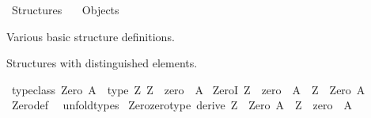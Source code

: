 %
\begin{isabellebody}%
%
%
\isadelimdocument
%
\endisadelimdocument
%
\isatagdocument
\isanewline
\isanewline
%
\isamarkuptrue%
%
\endisatagdocument
{\isafolddocument}%
%
\isadelimdocument
%
\endisadelimdocument
%
\isadelimtheory
%
\endisadelimtheory
%
\isatagtheory
{}\isamarkupfalse%
\ Structures\isanewline
\ \ \ Objects\isanewline
{}%
\endisatagtheory
{\isafoldtheory}%
%
\isadelimtheory
%
\endisadelimtheory
%
\begin{isamarkuptext}%
Various basic structure definitions.%
\end{isamarkuptext}\isamarkuptrue%
%
\isadelimdocument
%
\endisadelimdocument
%
\isatagdocument
%
\isamarkuptrue%
%
\endisatagdocument
{\isafolddocument}%
%
\isadelimdocument
%
\endisadelimdocument
%
\begin{isamarkuptext}%
Structures with distinguished elements.%
\end{isamarkuptext}\isamarkuptrue%
\isamarkupfalse%
\ {\isacharbrackleft}{\kern0pt}typeclass{\isacharbrackright}{\kern0pt}{\isacharcolon}{\kern0pt}\ {\isachardoublequoteopen}Zero\ A\ {\isasymequiv}\ type\ {\isacharparenleft}{\kern0pt}{\isasymlambda}Z{\isachardot}{\kern0pt}\ Z\ {\isacharat}{\kern0pt}{\isacharat}{\kern0pt}\ zero\ {\isacharcolon}{\kern0pt}\ A{\isacharparenright}{\kern0pt}{\isachardoublequoteclose}\isanewline
\isanewline
{}\isamarkupfalse%
\ ZeroI{\isacharcolon}{\kern0pt}\ {\isachardoublequoteopen}Z\ {\isacharat}{\kern0pt}{\isacharat}{\kern0pt}\ zero\ {\isacharcolon}{\kern0pt}\ A\ {\isasymLongrightarrow}\ Z\ {\isacharcolon}{\kern0pt}\ Zero\ A{\isachardoublequoteclose}\isanewline
%
\isadelimproof
\ \ %
\endisadelimproof
%
\isatagproof
{}\isamarkupfalse%
\ Zero{\isacharunderscore}{\kern0pt}def\ \isamarkupfalse%
\ unfold{\isacharunderscore}{\kern0pt}types%
\endisatagproof
{\isafoldproof}%
%
\isadelimproof
\isanewline
%
\endisadelimproof
\isanewline
{}\isamarkupfalse%
\ Zero{\isacharunderscore}{\kern0pt}zero{\isacharunderscore}{\kern0pt}type\ {\isacharbrackleft}{\kern0pt}derive{\isacharbrackright}{\kern0pt}{\isacharcolon}{\kern0pt}\ {\isachardoublequoteopen}Z\ {\isacharcolon}{\kern0pt}\ Zero\ A\ {\isasymLongrightarrow}\ Z\ {\isacharat}{\kern0pt}{\isacharat}{\kern0pt}\ zero\ {\isacharcolon}{\kern0pt}\ A{\isachardoublequoteclose}\isanewline
%
\isadelimproof
\ \ %
\endisadelimproof

\end{isabellebody}
